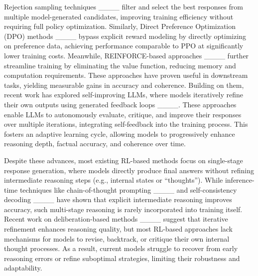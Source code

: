 Rejection sampling techniques ____ filter and select the best responses from multiple model-generated candidates, improving training efficiency without requiring full policy optimization. Similarly, Direct Preference Optimization (DPO) methods ____ bypass explicit reward modeling by directly optimizing on preference data, achieving performance comparable to PPO at significantly lower training costs. Meanwhile, REINFORCE-based approaches ____ further streamline training by eliminating the value function, reducing memory and computation requirements.
These approaches have proven useful in downstream tasks, yielding measurable gains in accuracy and coherence.
Building on them, recent work has explored self-improving LLMs, where models iteratively refine their own outputs using generated feedback loops ____. These approaches enable LLMs to autonomously evaluate, critique, and improve their responses over multiple iterations, integrating self-feedback into the training process. This fosters an adaptive learning cycle, allowing models to progressively enhance reasoning depth, factual accuracy, and coherence over time.

Despite these advances, most existing RL-based methods focus on single-stage response generation, where models directly produce final answers without refining intermediate reasoning steps (e.g., internal states or “thoughts”). While inference-time techniques like chain-of-thought prompting ____ and self-consistency decoding ____ have shown that explicit intermediate reasoning improves accuracy, such multi-stage reasoning is rarely incorporated into training itself. Recent work on deliberation-based methods ____ suggest that iterative refinement enhances reasoning quality, but most RL-based approaches lack mechanisms for models to revise, backtrack, or critique their own internal thought processes. As a result, current models struggle to recover from early reasoning errors or refine suboptimal strategies, limiting their robustness and adaptability.